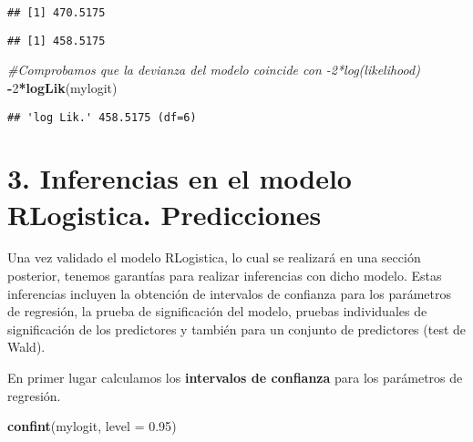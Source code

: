 \documentclass[
]{article}
\newenvironment{Shaded}{\begin{snugshade}}{\end{snugshade}}
\newcommand{\AttributeTok}[1]{\textcolor[rgb]{0.13,0.29,0.53}{#1}}
\newcommand{\CommentTok}[1]{\textcolor[rgb]{0.56,0.35,0.01}{\textit{#1}}}
\newcommand{\DecValTok}[1]{\textcolor[rgb]{0.00,0.00,0.81}{#1}}
\newcommand{\FloatTok}[1]{\textcolor[rgb]{0.00,0.00,0.81}{#1}}
\newcommand{\FunctionTok}[1]{\textcolor[rgb]{0.13,0.29,0.53}{\textbf{#1}}}
\newcommand{\NormalTok}[1]{#1}
\newcommand{\SpecialCharTok}[1]{\textcolor[rgb]{0.81,0.36,0.00}{\textbf{#1}}}
\begin{document}
\begin{verbatim}
## [1] 470.5175
\end{verbatim}

\begin{Shaded}
\end{Shaded}

\begin{verbatim}
## [1] 458.5175
\end{verbatim}

\begin{Shaded}
\begin{Highlighting}[]
\CommentTok{\#Comprobamos que la devianza del modelo coincide con {-}2*log(likelihood)}
\SpecialCharTok{{-}}\DecValTok{2}\SpecialCharTok{*}\FunctionTok{logLik}\NormalTok{(mylogit) }
\end{Highlighting}
\end{Shaded}

\begin{verbatim}
## 'log Lik.' 458.5175 (df=6)
\end{verbatim}

\hypertarget{inferencias-en-el-modelo-rlogistica.-predicciones}{%
\section{3. Inferencias en el modelo RLogistica.
Predicciones}\label{inferencias-en-el-modelo-rlogistica.-predicciones}}

Una vez validado el modelo RLogistica, lo cual se realizará en una
sección posterior, tenemos garantías para realizar inferencias con dicho
modelo. Estas inferencias incluyen la obtención de intervalos de
confianza para los parámetros de regresión, la prueba de significación
del modelo, pruebas individuales de significación de los predictores y
también para un conjunto de predictores (test de Wald).

En primer lugar calculamos los \textbf{intervalos de confianza} para los
parámetros de regresión.

\begin{Shaded}
\begin{Highlighting}[]
\FunctionTok{confint}\NormalTok{(mylogit, }\AttributeTok{level =} \FloatTok{0.95}\NormalTok{)}
\end{Highlighting}
\end{Shaded}
\end{document}
